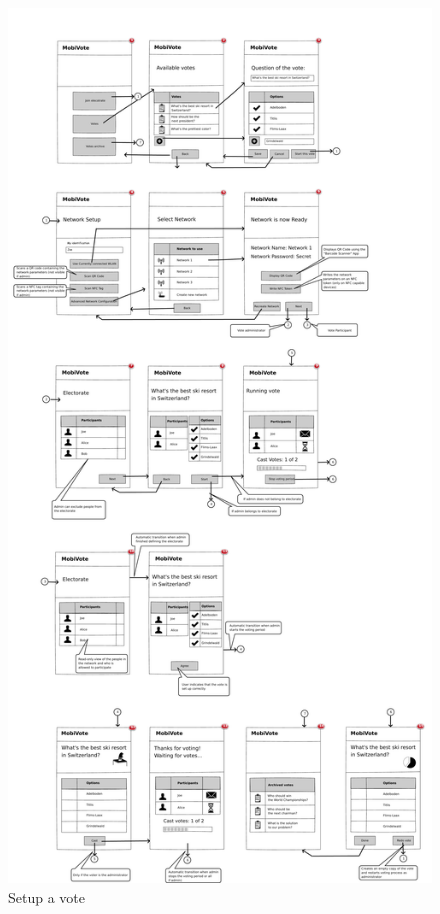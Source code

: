 \documentclass[numbers=noenddot, abstract=on, a4paper, headsepline,
footsepline, oneside, draft=off]{scrreprt}
\begin{document}
\begin{figure}[htb]
	\centering
	\includegraphics[height=.4\textheight]{img/storyboard/vote_setup}
	\caption{Setup a vote}
	\label{fig:vote_setup}
\end{figure}
\end{document}
